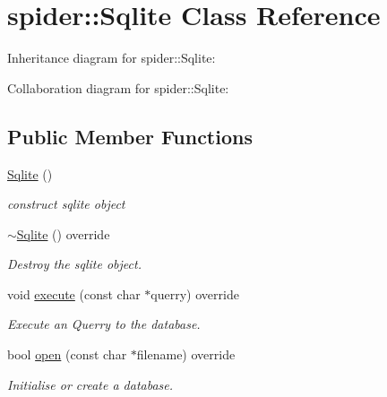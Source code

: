 \hypertarget{classspider_1_1_sqlite}{}\section{spider\+:\+:Sqlite Class Reference}
\label{classspider_1_1_sqlite}


Inheritance diagram for spider\+:\+:Sqlite\+:


Collaboration diagram for spider\+:\+:Sqlite\+:
\subsection*{Public Member Functions}
\begin{DoxyCompactItemize}
\item 
\mbox{\label{classspider_1_1_sqlite_a2ec0ea26050f3eb3569e7868d2731e07}} 
\hyperlink{classspider_1_1_sqlite_a2ec0ea26050f3eb3569e7868d2731e07}{Sqlite} ()
\begin{DoxyCompactList}\small\item\em construct sqlite object \end{DoxyCompactList}\item 
\mbox{\label{classspider_1_1_sqlite_a9bd2a45b85dd2f58dee0b7c179a0ea6a}} 
\hyperlink{classspider_1_1_sqlite_a9bd2a45b85dd2f58dee0b7c179a0ea6a}{$\sim$\+Sqlite} () override
\begin{DoxyCompactList}\small\item\em Destroy the sqlite object. \end{DoxyCompactList}\item 
void \hyperlink{classspider_1_1_sqlite_a169f434d0a8ece6711695815cd622253}{execute} (const char $\ast$querry) override
\begin{DoxyCompactList}\small\item\em Execute an Querry to the database. \end{DoxyCompactList}\item 
bool \hyperlink{classspider_1_1_sqlite_a753bd493b18a804e2533c10f821a714f}{open} (const char $\ast$filename) override
\begin{DoxyCompactList}\small\item\em Initialise or create a database. \end{DoxyCompactList}\item 
\mbox{\label{classspider_1_1_sqlite_a8f553c8250b53adb7839e1dd3e91398c}} 

\end{DoxyCompactItemize}
